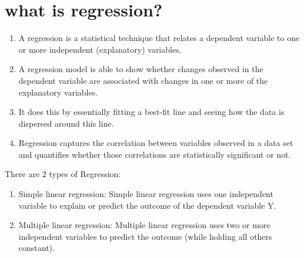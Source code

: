 \section{what is regression?}
    \begin{enumerate}
        \item A regression is a statistical technique that relates a dependent variable to one or more independent (explanatory) variables.
        \item A regression model is able to show whether changes observed in the dependent variable are associated with changes in one or more of the explanatory variables.
        \item It does this by essentially fitting a best-fit line and seeing how the data is dispersed around this line.
        \item Regression captures the correlation between variables observed in a data set and quantifies whether those correlations are statistically significant or not.    
    \end{enumerate}
    There are 2 types of Regression:
    \begin{enumerate}
        \item Simple linear regression: Simple linear regression uses one independent variable to explain or predict the outcome of the dependent variable Y.
        \item Multiple linear regression: Multiple linear regression uses two or more independent variables to predict the outcome (while holding all others constant).
    \end{enumerate}
